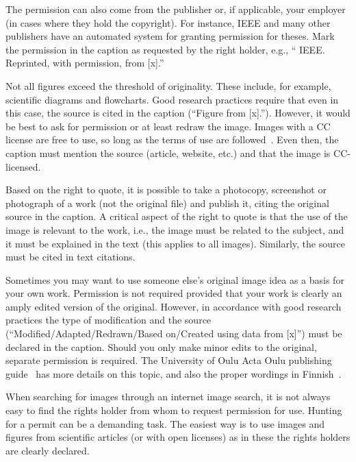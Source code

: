 The permission can also come from the publisher or, if applicable, your employer (in cases where they hold the copyright). For instance, IEEE and many other publishers have an automated system for granting permission for theses. Mark the permission in the caption as requested by the right holder, e.g., “ IEEE. Reprinted, with
permission, from [x].''

Not all figures exceed the threshold of originality. These include,
for example, scientific diagrams and flowcharts. Good research
practices require that even in this case, the source is cited in the
caption (\enquote{Figure from [x].}). However, it would be best to ask
for permission or at least redraw the image. Images with a CC license
are free to use, so long as the terms of use are
followed~\cite{about_cc_licenses}. Even then, the caption must mention
the source (article, website, etc.) and that the image is CC-licensed.

Based on the right to quote, it is possible to take a photocopy,
screenshot or photograph of a work (not the original file) and publish
it, citing the original source in the caption. A critical aspect of
the right to quote is that the use of the image is relevant to the
work, i.e., the image must be related to the subject, and it must be
explained in the text (this applies to all images). Similarly, the
source must be cited in text citations.

Sometimes you may want to use someone else's original image idea as a
basis for your own work. Permission is not required provided that your
work is clearly an amply edited version of the original. However, in
accordance with good research practices the type of modification and the
source (``Modified/Adapted/Redrawn/Based on/Created using data from
[x]'') must be declared in the caption. Should you only make minor
edits to the original, separate permission is required. The University
of Oulu Acta Oulu publishing guide~\cite{ronkainen_copyright} has more
details on this topic, and also the proper wordings in
Finnish~\cite{ronkainen_tekijanoikeus}.

When searching for images through an internet image search, it is not
always easy to find the rights holder from whom to request permission
for use. Hunting for a permit can be a demanding task. The easiest way
is to use images and figures from scientific articles (or with open
licenses) as in these the rights holders are clearly declared.

